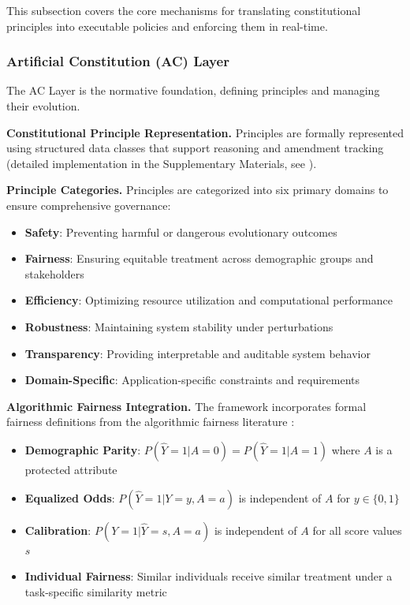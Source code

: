 \documentclass[manuscript,screen,review,anonymous,9pt]{acmart}
\begin{document}
This subsection covers the core mechanisms for translating constitutional principles into executable policies and enforcing them in real-time.

\subsubsection{Artificial Constitution (AC) Layer}
The AC Layer is the normative foundation, defining principles and managing their evolution.

\textbf{Constitutional Principle Representation.} Principles are formally represented using structured data classes that support reasoning and amendment tracking (detailed implementation in the Supplementary Materials, see ).

\textbf{Principle Categories.} Principles are categorized into six primary domains to ensure comprehensive governance:

\begin{itemize}
	\item \textbf{Safety}: Preventing harmful or dangerous evolutionary outcomes
	\item \textbf{Fairness}: Ensuring equitable treatment across demographic groups and stakeholders
	\item \textbf{Efficiency}: Optimizing resource utilization and computational performance
	\item \textbf{Robustness}: Maintaining system stability under perturbations
	\item \textbf{Transparency}: Providing interpretable and auditable system behavior
	\item \textbf{Domain-Specific}: Application-specific constraints and requirements
\end{itemize}

\textbf{Algorithmic Fairness Integration.} The framework incorporates formal fairness definitions from the algorithmic fairness literature \cite{Barocas2023FairnessML, Hardt2016EqualityOpportunity, Chouldechova2017FairPrediction, Dwork2012DifferentialPrivacy}:

\begin{itemize}
	\item \textbf{Demographic Parity}: $P(\hat{Y} = 1 | A = 0) = P(\hat{Y} = 1 | A = 1)$ where $A$ is a protected attribute
	\item \textbf{Equalized Odds}: $P(\hat{Y} = 1 | Y = y, A = a)$ is independent of $A$ for $y \in \{0,1\}$
	\item \textbf{Calibration}: $P(Y = 1 | \hat{Y} = s, A = a)$ is independent of $A$ for all score values $s$
	\item \textbf{Individual Fairness}: Similar individuals receive similar treatment under a task-specific similarity metric
\end{itemize}
\end{document}
